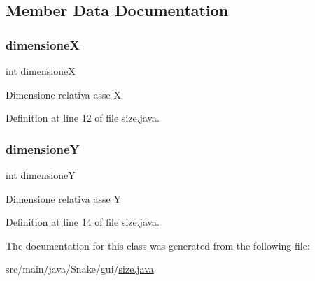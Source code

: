 \subsection{Member Data Documentation}
\mbox{\label{class_snake_1_1gui_1_1size_a0bdeac13931981470cd6efb046fa159e}} 
\subsubsection{\texorpdfstring{dimensioneX}{dimensioneX}}
{\footnotesize\ttfamily int dimensioneX\hspace{0.3cm}{\ttfamily [private]}}

Dimensione relativa asse X 

Definition at line 12 of file size.\+java.

\mbox{\label{class_snake_1_1gui_1_1size_aac148f9dd42d2e927b0ae441ad2f6a41}} 
\subsubsection{\texorpdfstring{dimensioneY}{dimensioneY}}
{\footnotesize\ttfamily int dimensioneY\hspace{0.3cm}{\ttfamily [private]}}

Dimensione relativa asse Y 

Definition at line 14 of file size.\+java.



The documentation for this class was generated from the following file\+:\begin{DoxyCompactItemize}
\item 
src/main/java/\+Snake/gui/\mbox{\hyperlink{size_8java}{size.\+java}}\end{DoxyCompactItemize}
